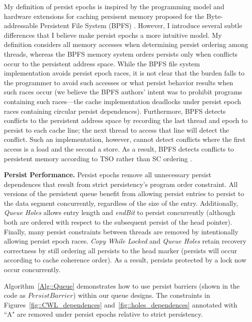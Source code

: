 My definition of persist epochs is inspired by the programming model and hardware extensions for caching persisent memory proposed for the Byte-addressable Persistent File System (BPFS) \cite{Condit09}.
However, I introduce several subtle differences that I believe make persist epochs a more intuitive model.
My definition considers all memory accesses when determining persist ordering among threads, whereas the BPFS memory system orders persists only when conflicts occur to the persistent address space.
While the BPFS file system implementation avoids persist epoch races, it is not clear that the burden falls to the programmer to avoid such accesses or what persist behavior results when such races occur (we believe the BPFS authors' intent was to prohibit programs containing such races---the cache implementation deadlocks under persist epoch races containing circular persist dependences).  
Furthermore, BPFS detects conflicts to the persistent address space by recording the last thread and epoch to persist to each cache line; the next thread to access that line will detect the conflict.
Such an implementation, however, cannot detect conflicts where the first access is a load and the second a store.
As a result, BPFS detects conflicts to persistent memory according to TSO rather than SC ordering \cite{SPARCv9}.

\textbf{Persist Performance.}
Persist epochs remove all unnecessary persist dependences that result from strict persistency's program order constraint.
All versions of the persistent queue benefit from allowing persist entries to persist to the data segment concurrently, regardless of the size of the entry.
Additionally, \emph{Queue Holes} allows entry length and \emph{endBit} to persist concurrently (although both are ordered with respect to the subsequent persist of the head pointer).
Finally, many persist constraints between threads are removed by intentionally allowing persist epoch races.
\emph{Copy While Locked} and \emph{Queue Holes} retain recovery correctness by still ordering all persists to the head marker (persists will occur according to cache coherence order).
As a result, persists protected by a lock now occur concurrently.

Algorithm~\ref{Alg::Queue} demonstrates how to use persist barriers (shown in the code as $PersistBarrier$) within our queue designs.
The constraints in Figures~\ref{fig::CWL_dependences} and~\ref{fig::holes_dependences} annotated with ``A" are removed under persist epochs relative to strict persistency.


